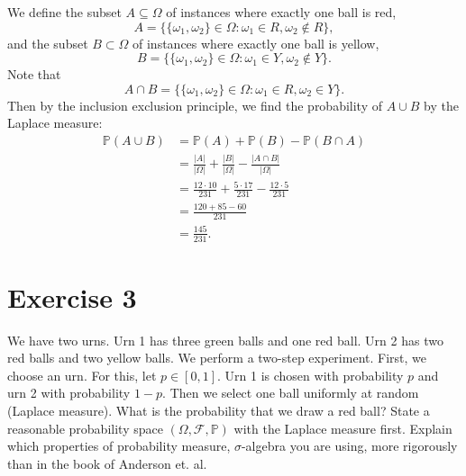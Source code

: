 \documentclass[12pt]{article}
\newenvironment{problem}
    {\begin{lrbox}{\mybox}\begin{minipage}{\textwidth-10pt}}
    {\end{minipage}\end{lrbox}\framebox[6.5in]{\usebox{\mybox}}}
\newcommand{\FF}{\mathcal{F}}
\renewcommand{\P}{\mathbb{P}}
\begin{document}
We define the subset $A\subseteq\Omega$ of instances where exactly one ball is red,
\[A = \{\{\omega_1,\omega_2\} \in \Omega : \omega_1\in R, \omega_2\notin R\},\]
and the subset $B\subset\Omega$ of instances where exactly one ball is yellow,
\[B = \{\{\omega_1,\omega_2\} \in \Omega : \omega_1\in Y, \omega_2\notin Y\}.\]
Note that
\[A\cap B = \{\{\omega_1,\omega_2\} \in \Omega : \omega_1\in R, \omega_2\in Y\}.\]
Then by the inclusion exclusion principle, we find the probability of $A\cup B$ by the Laplace measure:
\begin{align*}
    \P(A\cup B) 
        &= \P(A) + \P(B) - \P(B\cap A) \\
        &= \frac{|A|}{|\Omega|} + \frac{|B|}{|\Omega|} - \frac{|A\cap B|}{|\Omega|} \\
        &= \frac{12\cdot 10}{231} + \frac{5\cdot 17}{231} - \frac{12\cdot 5}{231} \\
        &= \frac{120 + 85 - 60}{231} \\
        &= \frac{145}{231}.
\end{align*}

\newpage
\section*{Exercise 3}
\begin{problem}
    We have two urns. Urn 1 has three green balls and one red ball. Urn 2 has two red balls and two yellow balls. We perform a two-step experiment. First, we choose an urn. For this, let $p\in[0,1]$. Urn 1 is chosen with probability $p$ and urn 2 with probability $1-p$. Then we select one ball uniformly at random (Laplace measure). What is the probability that we draw a red ball? State a reasonable probability space $(\Omega, \FF, \P)$ with the Laplace measure first. Explain which properties of probability measure, $\sigma$-algebra you are using, more rigorously than in the book of Anderson et. al.
\end{problem}
\paragraph{}
\end{document}
